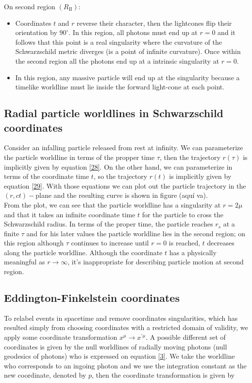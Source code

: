 \documentclass[letterpaper,11pt,onecolumn]{article}
\begin{document}
On second region $(R_{\mathrm{II}})$:
\begin{itemize}
  \item  Coordinates $t$ and $r$ reverse their character, then the lightcones flip their orientation by $90^{\circ}$. In this region, all photons must end up at $r=0$ and it follows that this point is a real singularity where the curvature of the Schwarzschild metric diverges (is a point of infinite curvature). Once within the second region  all the photons end up at a intrinsic singularity at $r=0$.
  \item In this region, any massive particle
will end up at the singularity because a timelike worldline must lie inside the forward light-cone at each point.

\end{itemize}
\subsection{Radial particle worldlines in Schwarzschild coordinates}

Consider an infalling particle released from rest at infinity. We can parameterize the particle worldline in terms of the propper time $\tau$, then the trajectory $r(\tau)$ is implicitly given by equation \ref{28}. On the other hand, we can parameterize in terms of the coordinate time $t$, so the trajectory $r(t)$ is implicitly given by equation \ref{29}. With those equations we can plot out the particle trajectory in the $(r,ct)-$plane and the resulting curve is shown in figure (aquí va). \\
From the plot, we can see that the particle worldline has a singularity at $r=2\mu$ and that it takes an infinite coordinate time $t$ for the particle
to cross the Schwarzschild radius. In terms of the proper time, the particle reaches $r_s$ at a finite $\tau$ and for his later values the particle worldline lies in the second region; on this region although $\tau$ continues to increase until $r=0$ is reached,  $t$ decreases along the particle worldline. Although the coordinate $t$ has a physically meaningful as $r\rightarrow \infty$, it's inappropriate for describing particle motion at second region.

\subsection{Eddington-Finkelstein coordinates}

To relabel events in spacetime and remove coordinates singularities, which has resulted simply from choosing coordinates with a restricted domain of validity, we apply some coordinate transformation $x^{\mu}\rightarrow x^{'\mu}$. A possible different set of coordinates is given by the null worldlines of radially moving photons (null geodesics of photons) who is expressed on equation \ref{3}. We take the worldline who corresponds to an ingoing photon and we use the integration constant as the new coordinate, denoted by $p$, then the coordinate transformation is given by 
\end{document}
